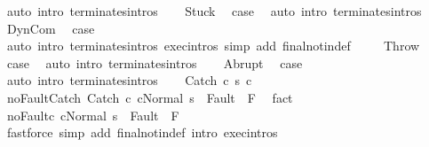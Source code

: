 \begin{isabellebody}
\ {\isacharparenleft}auto\ intro{\isacharcolon}\ terminates{\isachardot}intros{\isacharparenright}\isanewline
{}\isamarkupfalse%
\isanewline
\ \ \isamarkupfalse%
\ Stuck\ \isamarkupfalse%
\ {\isacharquery}case\ \isamarkupfalse%
\ {\isacharparenleft}auto\ intro{\isacharcolon}\ terminates{\isachardot}intros{\isacharparenright}\isanewline
{}\isamarkupfalse%
\isanewline
\ \ \isamarkupfalse%
\ DynCom\ \isamarkupfalse%
\ {\isacharquery}case\ \isanewline
\ \ \ \ \isamarkupfalse%
\ {\isacharparenleft}auto\ intro{\isacharcolon}\ terminates{\isachardot}intros\ exec{\isachardot}intros\ simp\ add{\isacharcolon}\ final{\isacharunderscore}notin{\isacharunderscore}def\ {\isacharparenright}\isanewline
{}\isamarkupfalse%
\isanewline
\ \ \isamarkupfalse%
\ Throw\ \isamarkupfalse%
\ {\isacharquery}case\ \isamarkupfalse%
\ {\isacharparenleft}auto\ intro{\isacharcolon}\ terminates{\isachardot}intros{\isacharparenright}\isanewline
{}\isamarkupfalse%
\isanewline
\ \ \isamarkupfalse%
\ Abrupt\ \isamarkupfalse%
\ {\isacharquery}case\ \isamarkupfalse%
\ {\isacharparenleft}auto\ intro{\isacharcolon}\ terminates{\isachardot}intros{\isacharparenright}\isanewline
{}\isamarkupfalse%
\isanewline
\ \ \isamarkupfalse%
\ {\isacharparenleft}Catch\ c{}\ s\ c{}{\isacharparenright}\isanewline
\ \ \isamarkupfalse%
\ noFault{\isacharunderscore}Catch{\isacharcolon}\ {\isachardoublequoteopen}{\isasymGamma}{\isasymturnstile}{\isasymlangle}Catch\ c{}\ c{}{\isacharcomma}Normal\ s\ {\isasymrangle}\ {\isasymRightarrow}{\isasymnotin}Fault\ {\isacharbackquote}\ F{\isachardoublequoteclose}\ \isamarkupfalse%
\ fact\isanewline
\ \ \isamarkupfalse%
\ noFault{\isacharunderscore}c{}{\isacharcolon}\ {\isachardoublequoteopen}{\isasymGamma}{\isasymturnstile}{\isasymlangle}c{}{\isacharcomma}Normal\ s\ {\isasymrangle}\ {\isasymRightarrow}{\isasymnotin}Fault\ {\isacharbackquote}\ F{\isachardoublequoteclose}\isanewline
\ \ \ \ \isamarkupfalse%
\ {\isacharparenleft}fastforce\ simp\ add{\isacharcolon}\ final{\isacharunderscore}notin{\isacharunderscore}def\ intro{\isacharcolon}\ exec{\isachardot}intros{\isacharparenright}\isanewline
\ \ \isamarkupfalse%
\ \isamarkupfalse%

\end{isabellebody}

